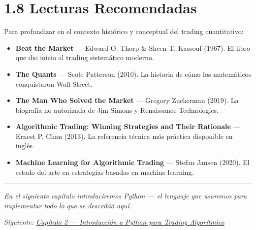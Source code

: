 \documentclass[12pt, a4paper, twoside, openright]{book}
\providecommand{\tightlist}{%
  \setlength{\itemsep}{2pt}\setlength{\parskip}{0pt}}
\numberwithin{figure}{chapter}
\numberwithin{table}{chapter}
\begin{document}
\section{1.8 Lecturas Recomendadas}\label{lecturas-recomendadas}

Para profundizar en el contexto histórico y conceptual del trading
cuantitativo:

\begin{itemize}
\tightlist
\item
  \textbf{Beat the Market} --- Edward O. Thorp \& Sheen T. Kassouf
  (1967). El libro que dio inicio al trading sistemático moderno.
\item
  \textbf{The Quants} --- Scott Patterson (2010). La historia de cómo
  los matemáticos conquistaron Wall Street.
\item
  \textbf{The Man Who Solved the Market} --- Gregory Zuckerman (2019).
  La biografía no autorizada de Jim Simons y Renaissance Technologies.
\item
  \textbf{Algorithmic Trading: Winning Strategies and Their Rationale}
  --- Ernest P. Chan (2013). La referencia técnica más práctica
  disponible en inglés.
\item
  \textbf{Machine Learning for Algorithmic Trading} --- Stefan Jansen
  (2020). El estado del arte en estrategias basadas en machine learning.
\end{itemize}

\begin{center}\rule{0.5\linewidth}{0.5pt}\end{center}

\emph{En el siguiente capítulo introduciremos Python --- el lenguaje que
usaremos para implementar todo lo que se describió aquí.}

\emph{Siguiente: \href{capitulo_02_introduccion_python.md}{Capítulo 2
--- Introducción a Python para Trading Algorítmico}}
\end{document}

